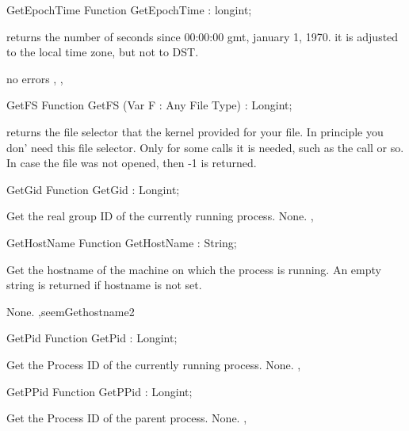 \html{}
\begin{function}{GetEpochTime}
\Declaration
Function GetEpochTime  : longint;

\Description

returns the number of seconds since 00:00:00 gmt, january 1, 1970.
it is adjusted to the local time zone, but not to DST.

\Errors
no errors
\SeeAlso
{}, , 
\end{function}
\latex{}
\html{}
\begin{function}{GetFS}
\Declaration
Function GetFS (Var F : Any File Type) : Longint;

\Description
{} returns the file selector that the kernel provided for your
file. In principle you don' need this file selector. Only for some calls
it is needed, such as the  call or so.
\Errors
In case the file was not opened, then -1 is returned.
\SeeAlso
{}
\end{function}
\latex{}
\html{}
\begin{function}{GetGid}
\Declaration
Function GetGid  : Longint;

\Description
 Get the real group ID of the currently running process.
\Errors
None.
\SeeAlso
{},  
\end{function}
\latex{}
\html{}
\begin{function}{GetHostName}
\Declaration
Function GetHostName  : String;

\Description

Get the hostname of the machine on which the process is running.
An empty string is returned if hostname is not set.

\Errors
None.
\SeeAlso
 ,seem{Gethostname}{2} 
\end{function}
\latex{}
\html{}
\begin{function}{GetPid}
\Declaration
Function GetPid  : Longint;

\Description
 Get the Process ID of the currently running process.
\Errors
None.
\SeeAlso
{}, 
\end{function}
\latex{}
\html{}
\begin{function}{GetPPid}
\Declaration
Function GetPPid  : Longint;

\Description
 Get the Process ID of the parent process.
\Errors
None.
\SeeAlso
{}, 
\end{function}
